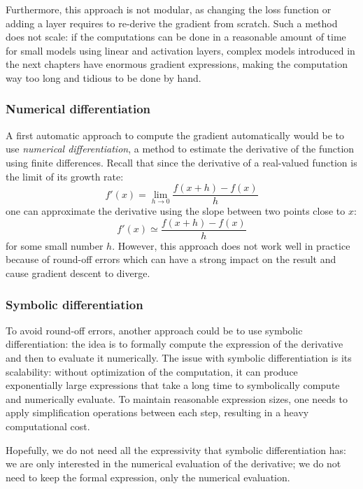 Furthermore, this approach is not modular, as changing the loss function or adding a layer requires to re-derive the gradient from scratch. Such a method does not scale: if the computations can be done in a reasonable amount of time for small models using linear and activation layers, complex models introduced in the next chapters have enormous gradient expressions, making the computation way too long and tidious to be done by hand.

\subsubsection{Numerical differentiation}
A first automatic approach to compute the gradient automatically would be to use \emph{numerical differentiation}, a method to estimate the derivative of the function using finite differences. Recall that since the derivative of a real-valued function is the limit of its growth rate:
\begin{equation*}
    f'(x) = \lim_{h\to0} \frac{f(x+h)-f(x)}{h}
\end{equation*}
one can approximate the derivative using the slope between two points close to $x$:
\begin{equation*}
    f'(x) \simeq \frac{f(x+h)-f(x)}{h}
\end{equation*}
for some small number $h$. However, this approach does not work well in practice because of round-off errors which can have a strong impact on the result and cause gradient descent to diverge.

\subsubsection{Symbolic differentiation}
To avoid round-off errors, another approach could be to use symbolic differentiation: the idea is to formally compute the expression of the derivative and then to evaluate it numerically. The issue with symbolic differentiation is its scalability: without optimization of the computation, it can produce exponentially large expressions that take a long time to symbolically compute and numerically evaluate. To maintain reasonable expression sizes, one needs to apply simplification operations between each step, resulting in a heavy computational cost.

Hopefully, we do not need all the expressivity that symbolic differentiation has: we are only interested in the numerical evaluation of the derivative; we do not need to keep the formal expression, only the numerical evaluation. 

